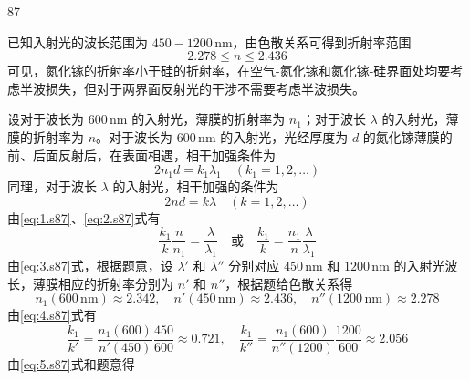 \begin{solution}{87}
    \begin{subsolution}
        \begin{subsubsolution}
            已知入射光的波长范围为 $450 - 1200\,\mathrm{nm}$，由色散关系可得到折射率范围
            \[
                2.278 \leq n \leq 2.436
            \]
            可见，氮化镓的折射率小于硅的折射率，在空气-氮化镓和氮化镓-硅界面处均要考虑半波损失，但对于两界面反射光的干涉不需要考虑半波损失。

            设对于波长为 $600\,\mathrm{nm}$ 的入射光，薄膜的折射率为 $n_{1}$；对于波长 $\lambda$ 的入射光，薄膜的折射率为 $n$。对于波长为 $600\,\mathrm{nm}$ 的入射光，光经厚度为 $d$ 的氮化镓薄膜的前、后面反射后，在表面相遇，相干加强条件为
            \begin{equation}
                2 n_{1} d = k_{1} \lambda_{1} \quad (k_{1}=1,2,\dots)
                \label{eq:1.s87}
            \end{equation}
            同理，对于波长 $\lambda$ 的入射光，相干加强的条件为
            \begin{equation}
                2 n d = k \lambda \quad (k=1,2,\dots)
                \label{eq:2.s87}
            \end{equation}
            由\eqref{eq:1.s87}、\eqref{eq:2.s87}式有
            \begin{equation}
                \frac{k_{1}}{k} \frac{n}{n_{1}} = \frac{\lambda}{\lambda_{1}} \quad \text{或} \quad \frac{k_{1}}{k} = \frac{n_{1}}{n} \frac{\lambda}{\lambda_{1}}
                \label{eq:3.s87}
            \end{equation}
            由\eqref{eq:3.s87}式，根据题意，设 $\lambda'$ 和 $\lambda''$ 分别对应 $450\,\mathrm{nm}$ 和 $1200\,\mathrm{nm}$ 的入射光波长，薄膜相应的折射率分别为 $n'$ 和 $n''$，根据题给色散关系得
            \begin{equation}
                n_{1}(600\,\mathrm{nm}) \approx 2.342,\quad n'(450\,\mathrm{nm}) \approx 2.436,\quad n''(1200\,\mathrm{nm}) \approx 2.278
                \label{eq:4.s87}
            \end{equation}
            由\eqref{eq:4.s87}式有
            \begin{equation}
                \frac{k_{1}}{k'} = \frac{n_{1}(600)}{n'(450)} \frac{450}{600} \approx 0.721,\quad \frac{k_{1}}{k''} = \frac{n_{1}(600)}{n''(1200)} \frac{1200}{600} \approx 2.056
                \label{eq:5.s87}
            \end{equation}
            由\eqref{eq:5.s87}式和题意得

\end{subsubsolution}
\end{subsolution}
\end{solution}
